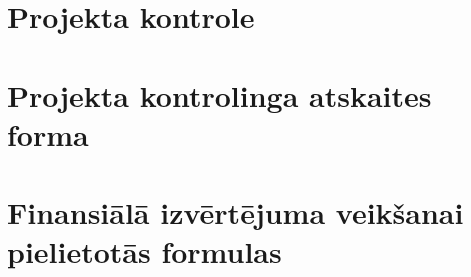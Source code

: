 \section{Projekta kontrole}
	\label{app:Projekta_kontrole}
    \begin{figure}[t]
        
    \end{figure}
    \clearpage
\section{Projekta kontrolinga atskaites forma}
	\label{app:Projekta_atskaitas_forma}
    \begin{figure}[t]
        
    \end{figure}
    \clearpage
\section{Finansiālā izvērtējuma veikšanai pielietotās formulas }
	\label{app:Projekta_formulas}
    \clearpage

